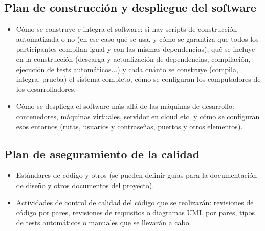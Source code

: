 \subsection{Plan de construcción y despliegue del software}

\begin{itemize}
	\item Cómo se construye e integra el software: si hay scripts de construcción automatizada o no (en ese caso qué se usa, y cómo se garantiza que todos los participantes compilan igual y con las mismas dependencias), qué se incluye en la construcción (descarga y actualización de dependencias, compilación, ejecución de tests automáticos...) y cada cuánto se construye (compila, integra, prueba) el sistema completo, cómo se configuran los computadores de los desarrolladores.
	\item Cómo se despliega el software más allá de las máquinas de desarrollo: contenedores, máquinas virtuales, servidor en cloud etc. y cómo se configuran esos entornos (rutas, usuarios y contraseñas, puertos y otros elementos).
\end{itemize}

\subsection{Plan de aseguramiento de la calidad}

\begin{itemize}
	\item Estándares de código y otros (se pueden definir guías para la documentación de diseño y otros documentos del proyecto).
	\item Actividades de control de calidad del código que se realizarán: revisiones de código por pares, revisiones de requisitos o diagramas UML por pares, tipos de tests automáticos o manuales que se llevarán a cabo.
\end{itemize}

